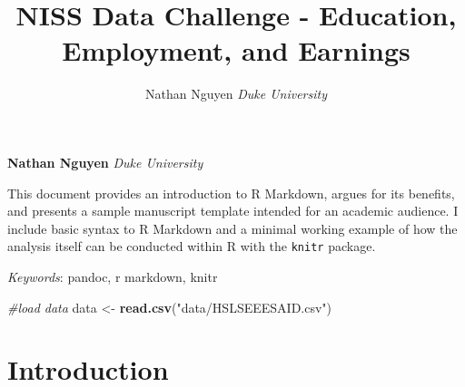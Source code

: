 \documentclass[11pt,]{article}
\title{NISS Data Challenge - Education, Employment, and Earnings  }
\author{\Large Nathan Nguyen\vspace{0.05in} \newline\normalsize\emph{Duke University}  }
\date{}
\newcommand*{\authorfont}{\fontfamily{phv}\selectfont}
\renewenvironment{abstract}
 {{%
    \setlength{\leftmargin}{0mm}
    \setlength{\rightmargin}{\leftmargin}%
  }%
  \relax}
 {\endlist}
\newenvironment{Shaded}{\begin{snugshade}}{\end{snugshade}}
\newcommand{\CommentTok}[1]{\textcolor[rgb]{0.56,0.35,0.01}{\textit{#1}}}
\newcommand{\KeywordTok}[1]{\textcolor[rgb]{0.13,0.29,0.53}{\textbf{#1}}}
\newcommand{\NormalTok}[1]{#1}
\newcommand{\StringTok}[1]{\textcolor[rgb]{0.31,0.60,0.02}{#1}}
\begin{document}
	
%

{%
\setlength{\parindent}{0pt}
\thispagestyle{plain}
{\fontsize{18}{20}\selectfont\raggedright 
\maketitle  %

}

{
   \vskip 13.5pt\relax \normalsize\fontsize{11}{12} 
\textbf{\authorfont Nathan Nguyen} \hskip 15pt \emph{\small Duke University}   

}

}








\begin{abstract}

    \hbox{\vrule height .2pt width 39.14pc}

    \vskip 8.5pt %

\noindent This document provides an introduction to R Markdown, argues for its
benefits, and presents a sample manuscript template intended for an
academic audience. I include basic syntax to R Markdown and a minimal
working example of how the analysis itself can be conducted within R
with the \texttt{knitr} package.


\vskip 8.5pt \noindent \emph{Keywords}: pandoc, r markdown, knitr \par

    \hbox{\vrule height .2pt width 39.14pc}



\end{abstract}


\vskip 6.5pt


\noindent  \begin{Shaded}
\begin{Highlighting}[]
\CommentTok{#load data}
\NormalTok{data <-}\StringTok{ }\KeywordTok{read.csv}\NormalTok{(}\StringTok{"data/HSLSEEESAID.csv"}\NormalTok{)}
\end{Highlighting}
\end{Shaded}

\hypertarget{introduction}{%
\section{Introduction}\label{introduction}}
\end{document}
